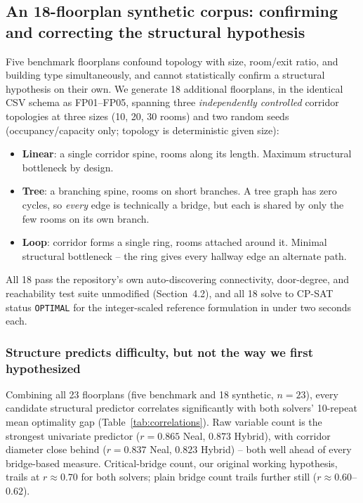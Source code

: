 \documentclass[11pt]{article}
\begin{document}
\subsection{An 18-floorplan synthetic corpus: confirming and correcting the structural hypothesis}
\label{sec:synthetic}
Five benchmark floorplans confound topology with size, room/exit ratio, and building type simultaneously, and cannot statistically confirm a structural hypothesis on their own. We generate 18 additional floorplans, in the identical CSV schema as FP01--FP05, spanning three \emph{independently controlled} corridor topologies at three sizes (10, 20, 30 rooms) and two random seeds (occupancy/capacity only; topology is deterministic given size):
\begin{itemize}[leftmargin=*]
\item \textbf{Linear}: a single corridor spine, rooms along its length. Maximum structural bottleneck by design.
\item \textbf{Tree}: a branching spine, rooms on short branches. A tree graph has zero cycles, so \emph{every} edge is technically a bridge, but each is shared by only the few rooms on its own branch.
\item \textbf{Loop}: corridor forms a single ring, rooms attached around it. Minimal structural bottleneck -- the ring gives every hallway edge an alternate path.
\end{itemize}
All 18 pass the repository's own auto-discovering connectivity, door-degree, and reachability test suite unmodified (Section~4.2), and all 18 solve to CP-SAT status \texttt{OPTIMAL} for the integer-scaled reference formulation in under two seconds each.

\subsubsection{Structure predicts difficulty, but not the way we first hypothesized}
Combining all 23 floorplans (five benchmark and 18 synthetic, $n=23$), every candidate structural predictor correlates significantly with both solvers' 10-repeat mean optimality gap (Table~\ref{tab:correlations}). Raw variable count is the strongest univariate predictor ($r=0.865$ Neal, $0.873$ Hybrid), with corridor diameter close behind ($r=0.837$ Neal, $0.823$ Hybrid) -- both well ahead of every bridge-based measure. Critical-bridge count, our original working hypothesis, trails at $r\approx0.70$ for both solvers; plain bridge count trails further still ($r\approx0.60$--$0.62$).
\end{document}
